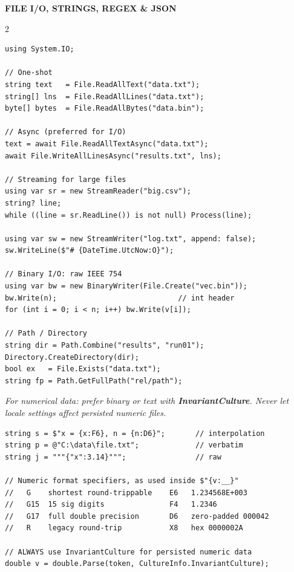 \documentclass[9pt,a4paper]{extarticle}
\newenvironment{card}[3][acBlue]{%
  \begin{tcolorbox}[
    enhanced, colback=#2, colframe=bdCard,
    coltitle=black, colbacktitle=#2!70!bgHdr,
    fonttitle=\bfseries\fontsize{6.16pt}{7.48pt}\selectfont\MakeUppercase,
    title={#3},
    left=3pt, right=2pt, top=1.4pt, bottom=1.8pt,
    toptitle=1pt, bottomtitle=1pt,
    boxrule=0.4pt,
    borderline west={3pt}{0pt}{#1},
    arc=2pt, before skip=0pt, after skip=1.6mm,
    breakable, toprule at break=0pt, bottomrule at break=0pt,
  ]}{\end{tcolorbox}}
\newcommand{\sectionbanner}[1]{%
  \vspace{0.4mm}%
  {\setlength{\fboxsep}{1.5pt}%
   \colorbox{secBg}{\color{white}\bfseries\fontsize{6.6pt}{7.9pt}\selectfont
   \MakeUppercase{\hspace{0.5mm}#1\hspace{0.5mm}}}%
  }\vspace{1.3mm}\par\nobreak}
\newcommand{\code}[1]{{\ttfamily\bfseries #1}}
\newcommand{\note}[1]{\par\noindent
  \begin{minipage}{\linewidth}%
  {\fontsize{5.6pt}{6.8pt}\selectfont\itshape #1}%
  \end{minipage}\par}
\begin{document}
\sectionbanner{File I/O, Strings, Regex \& JSON}
\begin{multicols}{2}

\begin{card}[acBlue]{bgBlue}{File \& Stream I/O}
\begin{lstlisting}[style=cs]
using System.IO;

// One-shot
string text   = File.ReadAllText("data.txt");
string[] lns  = File.ReadAllLines("data.txt");
byte[] bytes  = File.ReadAllBytes("data.bin");

// Async (preferred for I/O)
text = await File.ReadAllTextAsync("data.txt");
await File.WriteAllLinesAsync("results.txt", lns);

// Streaming for large files
using var sr = new StreamReader("big.csv");
string? line;
while ((line = sr.ReadLine()) is not null) Process(line);

using var sw = new StreamWriter("log.txt", append: false);
sw.WriteLine($"# {DateTime.UtcNow:O}");

// Binary I/O: raw IEEE 754
using var bw = new BinaryWriter(File.Create("vec.bin"));
bw.Write(n);                            // int header
for (int i = 0; i < n; i++) bw.Write(v[i]);

// Path / Directory
string dir = Path.Combine("results", "run01");
Directory.CreateDirectory(dir);
bool ex   = File.Exists("data.txt");
string fp = Path.GetFullPath("rel/path");
\end{lstlisting}
\note{For numerical data: prefer binary or text with \code{InvariantCulture}.
Never let locale settings affect persisted numeric files.}
\end{card}

\begin{card}[acGreen]{bgGreen}{Strings \& Number Formatting}
\begin{lstlisting}[style=cs]
string s = $"x = {x:F6}, n = {n:D6}";       // interpolation
string p = @"C:\data\file.txt";             // verbatim
string j = """{"x":3.14}""";                // raw

// Numeric format specifiers, as used inside $"{v:__}"
//   G    shortest round-trippable    E6   1.234568E+003
//   G15  15 sig digits               F4   1.2346
//   G17  full double precision       D6   zero-padded 000042
//   R    legacy round-trip           X8   hex 0000002A

// ALWAYS use InvariantCulture for persisted numeric data
double v = double.Parse(token, CultureInfo.InvariantCulture);


\end{lstlisting}
\end{card}
\end{multicols}
\end{document}
